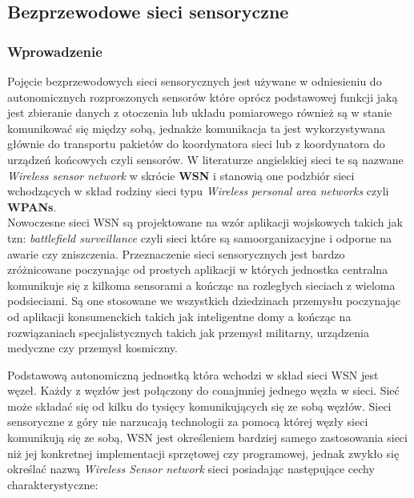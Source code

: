 \subsection{Bezprzewodowe sieci sensoryczne}

\subsubsection{Wprowadzenie}

\par 
\tab 	Pojęcie bezprzewodowych sieci sensorycznych jest używane w odniesieniu do autonomicznych rozproszonych sensorów które oprócz podstawowej funkcji jaką jest zbieranie danych z otoczenia lub układu pomiarowego również są w stanie komunikować się między sobą, jednakże komunikacja ta jest wykorzystywana głównie do transportu pakietów do koordynatora sieci lub z koordynatora do urządzeń końcowych czyli sensorów.
W literaturze angielskiej sieci te są nazwane \textit{Wireless sensor network} w skrócie \textbf{WSN} i stanowią one podzbiór sieci wchodzących w skład rodziny sieci typu \textit{Wireless personal area networks} czyli \textbf{WPANs}.
\\
Nowoczesne sieci WSN są projektowane na wzór aplikacji wojskowych takich jak tzn: \textit{battlefield surveillance} czyli sieci które są samoorganizacyjne i odporne na awarie czy zniszczenia.
Przeznaczenie sieci sensorycznych jest bardzo zróżnicowane poczynając od prostych aplikacji w których jednostka centralna komunikuje się z kilkoma sensorami a kończąc na rozległych sieciach z wieloma podsieciami. Są one stosowane we wszystkich dziedzinach przemysłu poczynając od aplikacji konsumenckich takich jak inteligentne domy a kończąc na rozwiązaniach specjalistycznych takich jak przemysł militarny, urządzenia medyczne czy przemysł kosmiczny.
\\
\par Podstawową autonomiczną jednostką która wchodzi w skład sieci WSN jest węzeł. Każdy z węzłów jest połączony do conajmniej jednego węzła w sieci. Sieć może składać się od kilku do tysięcy komunikujących się ze sobą węzłów. Sieci sensoryczne z góry nie narzucają technologii za pomocą której węzły sieci komunikują się ze sobą, WSN jest określeniem bardziej samego zastosowania sieci niż jej konkretnej implementacji sprzętowej czy programowej, jednak zwykło się określać nazwą \textit{Wireless Sensor network} sieci posiadając następujące cechy charakterystyczne: \\
\\
